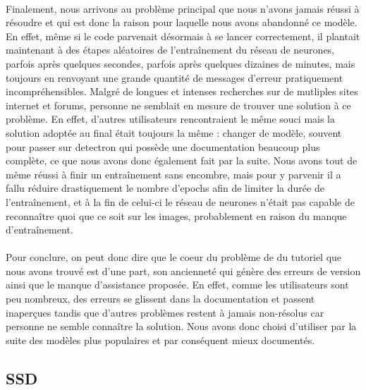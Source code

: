 \paragraph{} Finalement, nous arrivons au problème principal que nous n'avons jamais réussi à résoudre et qui est donc la raison pour laquelle nous avons abandonné ce modèle. En effet, même si le code parvenait désormais à se lancer correctement, il plantait maintenant à des étapes aléatoires de l'entraînement du réseau de neurones, parfois après quelques secondes, parfois après quelques dizaines de minutes, mais toujours en renvoyant une grande quantité de messages d'erreur pratiquement incompréhensibles. Malgré de longues et intenses recherches sur de mutliples sites internet et forums, personne ne semblait en mesure de trouver une solution à ce problème. En effet, d'autres utilisateurs rencontraient le même souci mais la solution adoptée au final était toujours la même : changer de modèle, souvent pour passer sur detectron qui possède une documentation beaucoup plus complète, ce que nous avons donc également fait par la suite. Nous avons tout de même réussi à finir un entraînement sans encombre, mais pour y parvenir il a fallu réduire drastiquement le nombre d'epochs afin de limiter la durée de l'entraînement, et à la fin de celui-ci le réseau de neurones n'était pas capable de reconnaître quoi que ce soit sur les images, probablement en raison du manque d'entraînement.

\paragraph{} Pour conclure, on peut donc dire que le coeur du problème de du tutoriel que nous avons trouvé est d'une part, son ancienneté qui génère des erreurs de version ainsi que le manque d'assistance proposée. En effet, comme les utilisateurs sont peu nombreux, des erreurs se glissent dans la documentation et passent inaperçues tandis que d'autres problèmes restent à jamais non-résolus car personne ne semble connaître la solution. Nous avons donc choisi d'utiliser par la suite des modèles plus populaires et par conséquent mieux documentés. 

\subsection{SSD}
